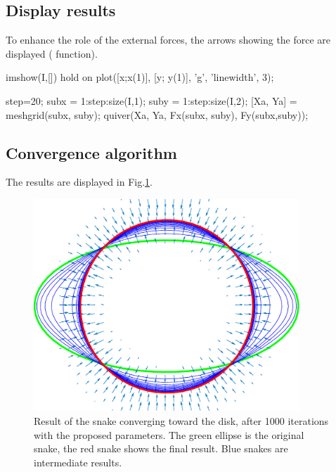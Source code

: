 \subsection{Display results}
To enhance the role of the external forces, the arrows showing the force are displayed ( function).

\begin{matlab}
imshow(I,[])
hold on
plot([x;x(1)], [y; y(1)], 'g', 'linewidth', 3);

step=20;
subx = 1:step:size(I,1);
suby = 1:step:size(I,2);
[Xa, Ya] = meshgrid(subx, suby);
quiver(Xa, Ya, Fx(subx, suby), Fy(subx,suby));
\end{matlab}

\subsection{Convergence algorithm}

The results are displayed in Fig.\ref{fig:active_contours:matlab:result}.

\begin{figure}
 \centering
 \includegraphics[width=10cm]{convergence.pdf}
 \caption{Result of the snake converging toward the disk, after 1000 iterations with the proposed parameters. 
 The green ellipse is the original snake, the red snake shows the final result. Blue snakes are intermediate results.}
 \label{fig:active_contours:matlab:result}
\end{figure}

